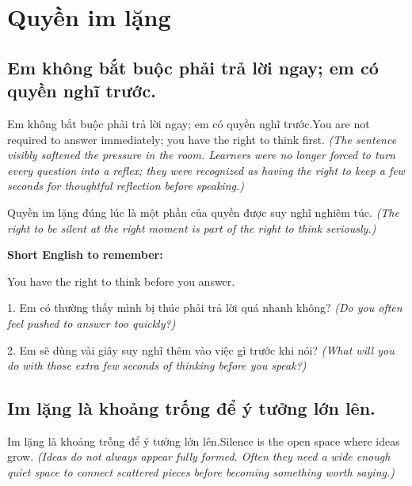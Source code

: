 \chapter{Quyền im lặng}


\section{Em không bắt buộc phải trả lời ngay; em có quyền nghĩ trước.}
\begin{truyen}{Em không bắt buộc phải trả lời ngay; em có quyền nghĩ trước.}{You are not required to answer immediately; you have the right to think first.}
\textit{(The sentence visibly softened the pressure in the room. Learners were no longer forced to turn every question into a reflex; they were recognized as having the right to keep a few seconds for thoughtful reflection before speaking.)}
\end{truyen}

\begin{baihoc}
Quyền im lặng đúng lúc là một phần của quyền được suy nghĩ nghiêm túc.
\textit{(The right to be silent at the right moment is part of the right to think seriously.)}
\end{baihoc}

\begin{ghinhoanh}
\textbf{Short English to remember:}

You have the right to think before you answer.

\end{ghinhoanh}

\begin{tuhocnhanh}
1. Em có thường thấy mình bị thúc phải trả lời quá nhanh không? \textit{(Do you often feel pushed to answer too quickly?)}

2. Em sẽ dùng vài giây suy nghĩ thêm vào việc gì trước khi nói? \textit{(What will you do with those extra few seconds of thinking before you speak?)}
\end{tuhocnhanh}
\ngancach


\section{Im lặng là khoảng trống để ý tưởng lớn lên.}
\begin{truyen}{Im lặng là khoảng trống để ý tưởng lớn lên.}{Silence is the open space where ideas grow.}
\textit{(Ideas do not always appear fully formed. Often they need a wide enough quiet space to connect scattered pieces before becoming something worth saying.)}
\end{truyen}

